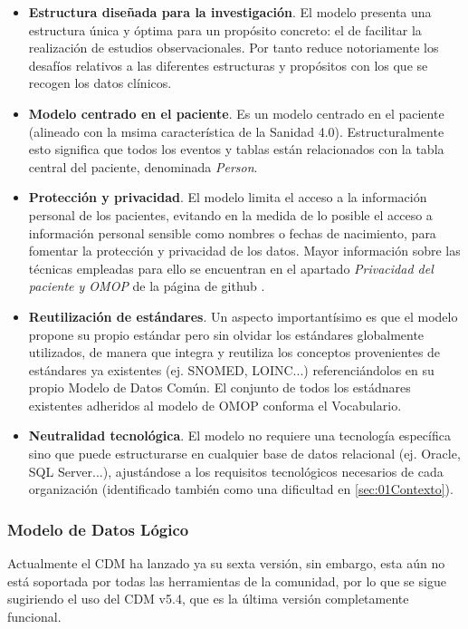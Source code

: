 \begin{itemize}
    \item \textbf{Estructura diseñada para la investigación}. 
    El modelo presenta una estructura única y óptima para un propósito concreto: el de facilitar la realización de estudios observacionales. Por tanto reduce notoriamente los desafíos relativos a las diferentes estructuras y propósitos con los que se recogen los datos clínicos.
    \item \textbf{Modelo centrado en el paciente}. Es un modelo centrado en el paciente (alineado con la msima característica de la Sanidad 4.0). Estructuralmente esto significa que todos los eventos y tablas están relacionados con la tabla central del paciente, denominada \textit{Person}. 
    \item \textbf{Protección y privacidad}. El modelo limita el acceso a la información personal de los pacientes, evitando en la medida de lo posible el acceso a información personal sensible como nombres o fechas de nacimiento, para fomentar la protección y privacidad de los datos. Mayor información sobre las técnicas empleadas para ello se encuentran en el apartado \textit{Privacidad del paciente y OMOP} de la página de github \cite{gitPagesCMD}.
    \item \textbf{Reutilización de estándares}. Un aspecto importantísimo es que el modelo propone su propio estándar pero sin olvidar los estándares globalmente utilizados, de manera que integra y reutiliza los conceptos provenientes de estándares ya existentes (ej. SNOMED, LOINC...) referenciándolos en su propio Modelo de Datos Común. El conjunto de todos los estádnares existentes adheridos al modelo de OMOP conforma el Vocabulario.
    \item \textbf{Neutralidad tecnológica}. El modelo no requiere una tecnología específica sino que puede estructurarse en cualquier base de datos relacional (ej. Oracle, SQL Server...), ajustándose a los requisitos tecnológicos necesarios de cada organización (identificado también como una dificultad en \ref{sec:01Contexto}).
    
\end{itemize}

\subsubsection{Modelo de Datos Lógico}

Actualmente el CDM ha lanzado ya su sexta versión, sin embargo, esta aún no está soportada por todas las herramientas de la comunidad, por lo que se sigue sugiriendo el uso del CDM v5.4, que es la última versión completamente funcional. 

